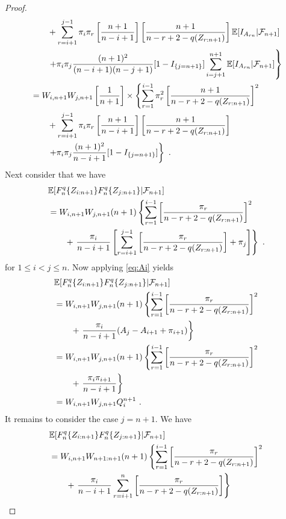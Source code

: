 \begin{proof}
\begin{align*}
	& \qquad + \sum\limits_{r=i+1}^{j-1}\pi_i\pi_r \left[\frac{n+1}{n-i+1}\right]\left[\frac{n+1}{n-r+2-q(Z_{r:n+1})}\right]\mathbb{E}[I_{A_{rn}}|\mathcal{F}_{n+1}]\\
	& \qquad \left. + \pi_i\pi_j \frac{(n+1)^2}{(n-i+1)(n-j+1)}[1-I_{\{j=n+1\}}]\sum\limits_{i=j+1}^{n+1}\mathbb{E}[I_{A_{rn}}|\mathcal{F}_{n+1}]\right\}\\
	&= W_{i,n+1}W_{j,n+1}\left[\frac{1}{n+1}\right] \times \left\{\sum\limits_{r=1}^{i-1}\pi_r^2\left[\frac{n+1}{n-r+2-q(Z_{r:n+1})} \right]^2\right.\\
	& \qquad + \sum\limits_{r=i+1}^{j-1}\pi_i\pi_r \left[\frac{n+1}{n-i+1}\right]\left[\frac{n+1}{n-r+2-q(Z_{r:n+1})}\right]\\
	& \qquad \left. + \pi_i\pi_j \frac{(n+1)^2}{n-i+1}[1-I_{\{j=n+1\}}]\right\}\textrm{ .}
\end{align*}
%
Next consider that we have  
\begin{align*}
	&  \mathbb{E}[F_n^q\{Z_{i:n+1}\}F_n^q\{Z_{j:n+1}\}|\mathcal{F}_{n+1}]\\
	&= W_{i,n+1}W_{j,n+1}(n+1) \left\{\sum\limits_{r=1}^{i-1}\left[\frac{\pi_r}{n-r+2-q(Z_{r:n+1})} \right]^2\right.\\
	& \qquad + \left. \frac{\pi_i}{n-i+1} \left[\sum\limits_{r=i+1}^{j-1} \left[\frac{\pi_r}{n-r+2-q(Z_{r:n+1})}\right] + \pi_j \right]\right\}\textrm{ .}
\end{align*}
for $1\leq i<j\leq n$. 
%
Now applying \eqref{eq:Ai} yields
\begin{align*}
	&  \mathbb{E}[F_n^q\{Z_{i:n+1}\}F_n^q\{Z_{j:n+1}\}|\mathcal{F}_{n+1}]\\
	&= W_{i,n+1}W_{j,n+1}(n+1) \left\{\sum\limits_{r=1}^{i-1}\left[\frac{\pi_r}{n-r+2-q(Z_{r:n+1})} \right]^2\right.\\
	& \qquad + \left. \frac{\pi_i}{n-i+1} (A_j - A_{i+1} + \pi_{i+1})\right\}\\
	&= W_{i,n+1}W_{j,n+1}(n+1) \left\{\sum\limits_{r=1}^{i-1}\left[\frac{\pi_r}{n-r+2-q(Z_{r:n+1})} \right]^2\right.\\
	& \qquad + \left. \frac{\pi_i\pi_{i+1}}{n-i+1}\right\}\\
	&= W_{i,n+1}W_{j,n+1}Q_i^{n+1}\textrm{ .}
\end{align*}
%
It remains to consider the case $j=n+1$. We have
\begin{align*}
	&  \E[F_n^q\{Z_{i:n+1}\}F_n^q\{Z_{j:n+1}\}|\F_{n+1}]\\
	&= \wn{i}{n+1}W_{n+1:n+1}(n+1) \left\{\sum\limits_{r=1}^{i-1}\left[\frac{\pi_r}{n-r+2-q(Z_{r:n+1})} \right]^2\right.\\
	& \qquad + \left. \frac{\pi_i}{n-i+1}\sum\limits_{r=i+1}^{n} \left[\frac{\pi_r}{n-r+2-q(Z_{r:n+1})}\right]\right\}\\

\end{align*}
\end{proof}
